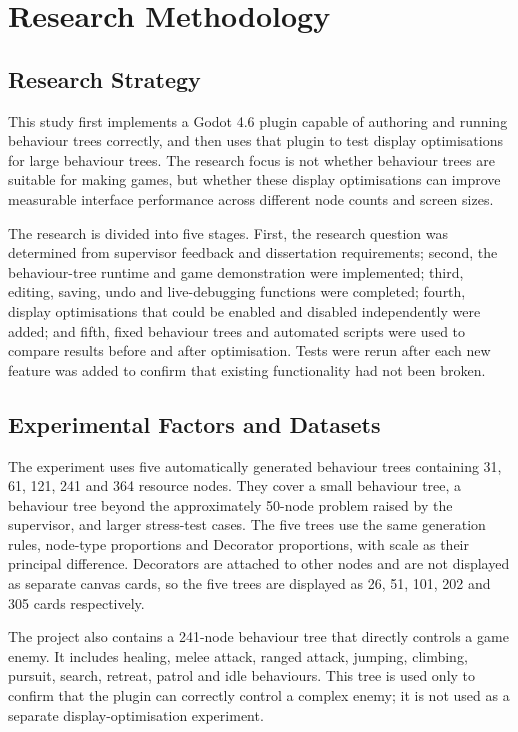 \chapter{Research Methodology}
\label{ch:methodology}

\section{Research Strategy}

This study first implements a Godot 4.6 plugin capable of authoring and running behaviour trees correctly, and then uses that plugin to test display optimisations for large behaviour trees. The research focus is not whether behaviour trees are suitable for making games, but whether these display optimisations can improve measurable interface performance across different node counts and screen sizes.

The research is divided into five stages. First, the research question was determined from supervisor feedback and dissertation requirements; second, the behaviour-tree runtime and game demonstration were implemented; third, editing, saving, undo and live-debugging functions were completed; fourth, display optimisations that could be enabled and disabled independently were added; and fifth, fixed behaviour trees and automated scripts were used to compare results before and after optimisation. Tests were rerun after each new feature was added to confirm that existing functionality had not been broken.

\section{Experimental Factors and Datasets}

The experiment uses five automatically generated behaviour trees containing 31, 61, 121, 241 and 364 resource nodes. They cover a small behaviour tree, a behaviour tree beyond the approximately 50-node problem raised by the supervisor, and larger stress-test cases. The five trees use the same generation rules, node-type proportions and Decorator proportions, with scale as their principal difference. Decorators are attached to other nodes and are not displayed as separate canvas cards, so the five trees are displayed as 26, 51, 101, 202 and 305 cards respectively.

The project also contains a 241-node behaviour tree that directly controls a game enemy. It includes healing, melee attack, ranged attack, jumping, climbing, pursuit, search, retreat, patrol and idle behaviours. This tree is used only to confirm that the plugin can correctly control a complex enemy; it is not used as a separate display-optimisation experiment.

